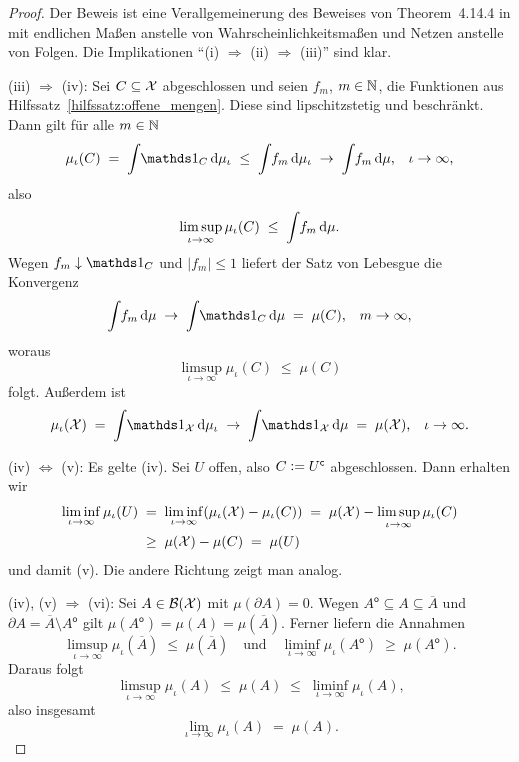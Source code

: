 \documentclass[../thesis/thesis.tex]{subfiles}
\begin{document}
	\begin{proof}
		Der Beweis ist eine Verallgemeinerung des Beweises von Theorem~4.14.4 in \cite{Simon.2015} mit endlichen Maßen 
		anstelle von Wahrscheinlichkeitsmaßen und Netzen anstelle von Folgen. Die Implikationen \enquote{(i) $\Rightarrow$ (ii) $\Rightarrow$ (iii)} sind klar. 
		
		(iii) $\Rightarrow$ (iv): Sei $C \subseteq \mathcal{X}$ abgeschlossen und seien 
		$f_m$, $m \in \mathbb{N}$, die Funktionen aus Hilfssatz~\ref{hilfssatz:offene_mengen}. 
		Diese sind lipschitzstetig und beschränkt.
		Dann gilt für alle $m \in \mathbb{N}$
		$$\mu_\iota(C) \; = \; \measureint{}{\indfct_C}{\mu_\iota} \; \leq \; 
		\measureint{}{f_m}{\mu_\iota} \; \to \;
		\measureint{}{f_m}{\mu} \text{,} \quad \iota \to \infty \text{,}$$
		also 
		$$\limsup_{\iota \to \infty} \mu_\iota(C) \; \leq \; 
		\int_{} \, f_m \, \mathrm{d}\mu \text{.}$$
		Wegen $f_m \convdown \indfct_C$ und $| f_m | \leq 1$ 
		liefert der Satz von Lebesgue die Konvergenz
		$$\measureint{}{f_m}{\mu} \; \to \;
		\measureint{}{\indfct_C}{\mu} \; = \; \mu(C) \text{,} 
		\quad m \to \infty \text{,}$$
		woraus
		$$\limsup_{\iota \to \infty} \mu_\iota(C) \; \leq \; \mu(C)$$
		folgt. Außerdem ist 
		$$\mu_\iota(\X) \; = \; \measureint{}{\indfct_{\X}}{\mu_\iota} \; \to \; \measureint{}{\indfct_{\X}}{\mu} \; = \; \mu(\X) \text{,} 
		\quad \iota \to \infty \text{.}$$
		
		(iv) $\Leftrightarrow$ (v): Es gelte (iv). Sei $U$ offen, also 
		$C \vcentcolon = U^\mathsf{c}$ abgeschlossen. Dann erhalten wir
		\begin{align*}
			\liminf_{\iota \to \infty} \mu_\iota(U) \; &= \; \liminf_{\iota \to \infty} (\mu_\iota(\mathcal{X}) - \mu_\iota(C)) \; = \;
			\mu(\mathcal{X}) - \limsup_{\iota \to \infty} \mu_\iota(C) \\
			&\geq \; 
			\mu(\mathcal{X}) - \mu(C) \; = \; \mu(U)
		\end{align*}
		und damit (v). Die andere Richtung zeigt man analog.
		
		(iv), (v) $\Rightarrow$ (vi): Sei $A \in \mathcal{B}(\mathcal{X})$ mit 
		$\mu(\partial A) = 0$. Wegen
		$A^\mathsf{o} \subseteq A \subseteq \overline{A}$ und 
		$\partial A = \overline{A} \setminus A^\mathsf{o}$ gilt $\mu(A^\mathsf{o}) = 
		\mu(A) = \mu(\overline{A}) \text{.}$
		Ferner liefern die Annahmen
		$$\limsup_{\iota \to \infty} \mu_\iota(\overline{A}) \; \leq \; 
		\mu(\overline{A}) \quad \text{und} \quad 
		\liminf_{\iota \to \infty} \mu_\iota(A^\mathsf{o}) \; \geq \; 
		\mu(A^\mathsf{o}) \text{.}$$
		Daraus folgt
		$$\limsup_{\iota \to \infty} \mu_\iota(A) \; \leq \; 
		\mu(A) \; \leq \; \liminf_{\iota \to \infty} \mu_\iota(A) \text{,}$$
		also insgesamt
		$$\lim_{\iota \to \infty} \mu_\iota(A) \; = \; \mu(A) \text{.}$$
		

\end{proof}
\end{document}
